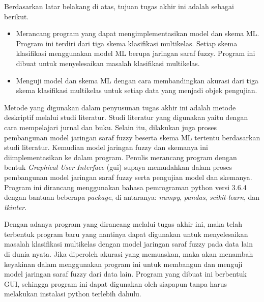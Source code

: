 \noindent Berdasarkan latar belakang di atas, tujuan tugas akhir ini adalah sebagai berikut.
\begin{itemize}
    \item Merancang program yang dapat mengimplementasikan model dan skema ML. Program ini terdiri dari tiga skema klasifikasi multikelas. Setiap skema klasifikasi menggunakan model ML berupa jaringan saraf fuzzy. Program ini dibuat untuk menyelesaikan masalah klasifikasi multikelas.
    \item Menguji model dan skema ML dengan cara membandingkan akurasi dari tiga skema klasifikasi multikelas untuk setiap data yang menjadi objek pengujian.
\end{itemize}

\noindent Metode yang digunakan dalam penyusunan tugas akhir ini adalah metode deskriptif melalui studi literatur. Studi literatur yang digunakan yaitu dengan cara mempelajari jurnal dan buku. Selain itu, dilakukan juga proses pembangunan model jaringan saraf fuzzy beserta skema ML tertentu berdasarkan studi literatur. Kemudian model jaringan fuzzy dan skemanya ini diimplementasikan ke dalam program. Penulis merancang program dengan bentuk \emph{Graphical User Interface} (\gls{gui}) supaya memudahkan dalam proses pembangunan model jaringan saraf fuzzy serta pengujian model dan skemanya. Program ini dirancang menggunakan bahasa pemrograman python versi 3.6.4 dengan bantuan beberapa \emph{package}, di antaranya: \emph{numpy}, \emph{pandas}, \emph{scikit-learn}, dan \emph{tkinter}.

\noindent Dengan adanya program yang dirancang melalui tugas akhir ini, maka telah terbentuk program baru yang nantinya dapat digunakan untuk menyelesaikan masalah klasifikasi multikelas dengan model jaringan saraf fuzzy pada data lain di dunia nyata. Jika diperoleh akurasi yang memuaskan, maka akan menambah keyakinan dalam menggunakan program ini untuk membangun dan menguji model jaringan saraf fuzzy dari data lain. Program yang dibuat ini berbentuk GUI, sehingga program ini dapat digunakan oleh siapapun tanpa harus melakukan instalasi python terlebih dahulu.

